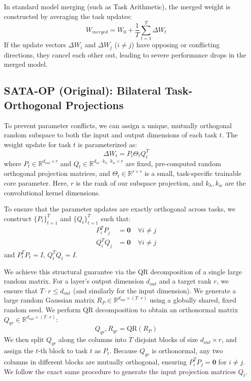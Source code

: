 \documentclass{article}
\theoremstyle{plain}
\theoremstyle{definition}
\theoremstyle{remark}
\begin{document}
In standard model merging (such as Task Arithmetic), the merged weight is constructed by averaging the task updates:
\begin{equation}
    W_{merged} = W_0 + \frac{1}{T} \sum_{t=1}^T \Delta W_t
\end{equation}
If the update vectors $\Delta W_i$ and $\Delta W_j$ ($i \neq j$) have opposing or conflicting directions, they cancel each other out, leading to severe performance drops in the merged model.

\subsection{SATA-OP (Original): Bilateral Task-Orthogonal Projections}
To prevent parameter conflicts, we can assign a unique, mutually orthogonal random subspace to both the input and output dimensions of each task $t$. The weight update for task $t$ is parameterized as:
\begin{equation}
    \Delta W_t = P_t \Theta_t Q_t^T
\end{equation}
where $P_t \in \mathbb{R}^{d_{out} \times r}$ and $Q_t \in \mathbb{R}^{d_{in} \cdot k_h \cdot k_w \times r}$ are fixed, pre-computed random orthogonal projection matrices, and $\Theta_t \in \mathbb{R}^{r \times r}$ is a small, task-specific trainable core parameter. Here, $r$ is the rank of our subspace projection, and $k_h, k_w$ are the convolutional kernel dimensions.

To ensure that the parameter updates are exactly orthogonal across tasks, we construct $\{P_t\}_{t=1}^T$ and $\{Q_t\}_{t=1}^T$ such that:
\begin{align}
    P_i^T P_j &= \mathbf{0} \quad \forall i \neq j \\
    Q_i^T Q_j &= \mathbf{0} \quad \forall i \neq j
\end{align}
and $P_t^T P_t = I$, $Q_t^T Q_t = I$.

We achieve this structural guarantee via the QR decomposition of a single large random matrix. For a layer's output dimension $d_{out}$ and a target rank $r$, we ensure that $T \cdot r \le d_{out}$ (and similarly for the input dimension). We generate a large random Gaussian matrix $R_P \in \mathbb{R}^{d_{out} \times (T \cdot r)}$ using a globally shared, fixed random seed. We perform QR decomposition to obtain an orthonormal matrix $Q_{qr} \in \mathbb{R}^{d_{out} \times (T \cdot r)}$:
\begin{equation}
    Q_{qr}, R_{qr} = \text{QR}(R_P)
\end{equation}
We then split $Q_{qr}$ along the columns into $T$ disjoint blocks of size $d_{out} \times r$, and assign the $t$-th block to task $t$ as $P_t$. Because $Q_{qr}$ is orthonormal, any two columns in different blocks are mutually orthogonal, ensuring $P_i^T P_j = \mathbf{0}$ for $i \neq j$. We follow the exact same procedure to generate the input projection matrices $Q_t$.
\end{document}
